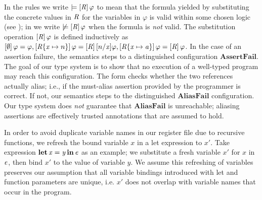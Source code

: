 In the rules  we write $\models  [  \mathit{R}  ] \, \varphi$ to mean that the formula
yielded by substituting the concrete values in $\mathit{R}$ for the variables in $\varphi$
is valid within some chosen logic (see ); in  we write $\not\models  [  \mathit{R}  ] \, \varphi$
when the formula is \emph{not} valid.
The substitution operation $[  \mathit{R}  ] \, \varphi$ is defined inductively as $[   \emptyset   ] \, \varphi  =  \varphi, [  \mathit{R}  \{  \mathit{x}  \mapsto  n  \}  ] \, \varphi  =  [  \mathit{R}  ] \, [  n  /  \mathit{x}  ]  \varphi, [  \mathit{R}  \{  \mathit{x}  \mapsto  \mathit{a}  \}  ] \, \varphi  =  [  \mathit{R}  ] \, \varphi$.
In the case of an assertion failure, the semantics steps to a distinguished
configuration $ \mathbf{AssertFail} $. The goal of our type system is to show that no
execution of a well-typed program may reach this configuration.
The  form checks whether the two references actually alias;
i.e., if the must-alias assertion provided by the programmer is correct.
If not, our semantics steps to the distinguished $ \mathbf{AliasFail} $ configuration.
Our type system does \emph{not} guarantee that $ \mathbf{AliasFail} $ is unreachable;
aliasing assertions are effectively trusted annotations that are assumed to hold.

In order to avoid duplicate variable names in our register file due to recursive functions,
we refresh the bound variable $\mathit{x}$ in a let expression to $\mathit{x'}$.
Take expression $ \operatorname{\mathbf{let}}  \mathit{x}  =  \mathit{y}  \operatorname{\mathbf{in}}  \mathit{e} $ as an example;
we substitute a fresh variable $\mathit{x'}$ for $\mathit{x}$ in $\mathit{e}$, then bind $\mathit{x'}$ to the value
of variable $\mathit{y}$.
We assume this refreshing of variables preserves our assumption that all variable
bindings introduced with let and function parameters are unique, i.e. $\mathit{x'}$ does
not overlap with variable names that occur in the program.
  


